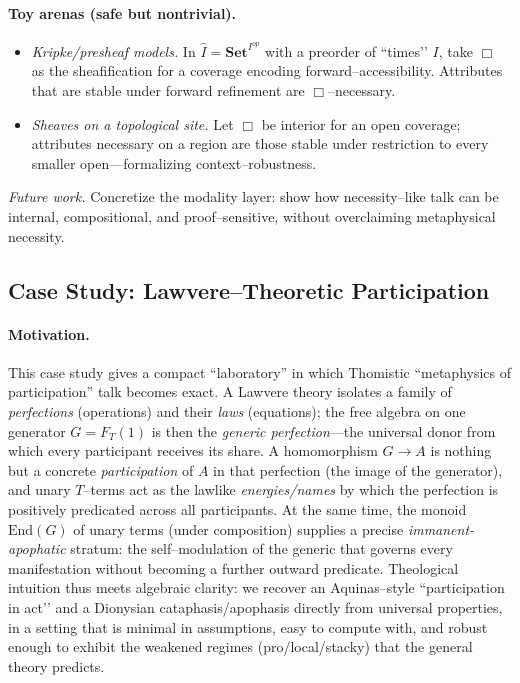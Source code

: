 \documentclass[11pt]{article}
\theoremstyle{upright}
\begin{document}
\paragraph{Toy arenas (safe but nontrivial).}
\begin{itemize}[leftmargin=2em]
\item \emph{Kripke/presheaf models.} In $\widehat{I}=\mathbf{Set}^{I^{op}}$ with a preorder of ``times’’ $I$, take $\Box$ as the sheafification for a coverage encoding forward–accessibility. Attributes that are stable under forward refinement are $\Box$–necessary.
\item \emph{Sheaves on a topological site.} Let $\Box$ be interior for an open coverage; attributes necessary on a region are those stable under restriction to every smaller open—formalizing context–robustness.
\end{itemize}
\emph{Future work.} Concretize the modality layer: show how necessity–like talk can be internal, compositional, and proof–sensitive, without overclaiming metaphysical necessity.

\subsection{Case Study: Lawvere–Theoretic Participation}\label{subsec:lawvere-case}

\paragraph{Motivation.}
This case study gives a compact ``laboratory'' in which Thomistic ``metaphysics of participation'' talk becomes exact. A Lawvere theory isolates a family of \emph{perfections} (operations) and their \emph{laws} (equations); the free algebra on one generator \(G=F_T(1)\) is then the \emph{generic perfection}—the universal donor from which every participant receives its share. A homomorphism \(G\to A\) is nothing but a concrete \emph{participation} of \(A\) in that perfection (the image of the generator), and unary \(T\)–terms act as the lawlike \emph{energies/names} by which the perfection is positively predicated across all participants. At the same time, the monoid \(\mathrm{End}(G)\) of unary terms (under composition) supplies a precise \emph{immanent-apophatic} stratum: the self–modulation of the generic that governs every manifestation without becoming a further outward predicate. Theological intuition thus meets algebraic clarity: we recover an Aquinas–style “participation in act’’ and a Dionysian cataphasis/apophasis directly from universal properties, in a setting that is minimal in assumptions, easy to compute with, and robust enough to exhibit the weakened regimes (pro/local/stacky) that the general theory predicts.
\end{document}
